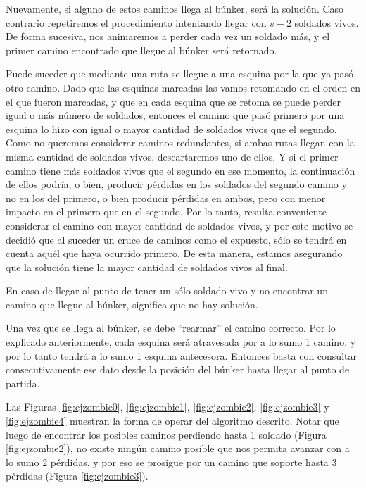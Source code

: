 Nuevamente, si alguno de estos caminos llega al búnker, será la solución.  Caso contrario repetiremos el procedimiento intentando llegar con $s-2$ soldados vivos. De forma sucesiva, nos animaremos a perder cada vez un soldado más, y el primer camino encontrado que llegue al búnker será retornado. 

Puede suceder que mediante una ruta se llegue a una esquina por la que ya pasó otro camino. Dado que las esquinas marcadas las vamos retomando en el orden en el que fueron marcadas, y que en cada esquina que se retoma se puede perder igual o más número de soldados, entonces el camino que pasó primero por una esquina lo hizo con igual o mayor cantidad de soldados vivos que el segundo.  Como no queremos considerar caminos redundantes, si ambas rutas llegan con la misma cantidad de soldados vivos, descartaremos uno de ellos. Y si el primer camino tiene más soldados vivos que el segundo en ese momento, la continuación de ellos podría, o bien, producir pérdidas en los soldados del segundo camino y no en los del primero, o bien producir pérdidas en ambos, pero con menor impacto en el primero que en el segundo. Por lo tanto, resulta conveniente considerar el camino con mayor cantidad de soldados vivos, y por este motivo se decidió que al suceder un cruce de caminos como el expuesto, sólo se tendrá en cuenta aquél que haya ocurrido primero. De esta manera, estamos asegurando que la solución tiene la mayor cantidad de soldados vivos al final. 

En caso de llegar al punto de tener un sólo soldado vivo y no encontrar un camino que llegue al búnker, significa que no hay solución.

Una vez que se llega al búnker, se debe ``rearmar'' el camino correcto.  Por lo explicado anteriormente, cada esquina será atravesada por a lo sumo 1 camino, y por lo tanto tendrá a lo sumo 1 esquina antecesora. Entonces basta con consultar consecutivamente ese dato desde la posición del búnker hasta llegar al punto de partida.

Las Figuras \ref{fig:ejzombie0}, \ref{fig:ejzombie1}, \ref{fig:ejzombie2}, \ref{fig:ejzombie3} y \ref{fig:ejzombie4} muestran la forma de operar del algoritmo descrito. Notar que luego de encontrar los posibles caminos perdiendo hasta 1 soldado (Figura \ref{fig:ejzombie2}), no existe ningún camino posible que nos permita avanzar con a lo sumo 2 pérdidas, y por eso se prosigue por un camino que soporte hasta 3 pérdidas (Figura \ref{fig:ejzombie3}).

